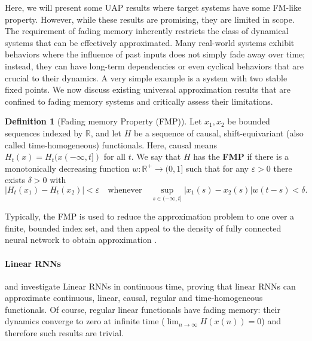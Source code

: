 \documentclass{article}
\theoremstyle{definition}
\newtheorem{definition}{Definition}
\theoremstyle{remark}
\newcounter{ct}
\begin{document}
Here, we will present some UAP results where target systems have some FM-like property.
However, while these results are promising, they are limited in scope.
The requirement of fading memory inherently restricts the class of dynamical systems that can be effectively approximated.
Many real-world systems exhibit behaviors where the influence of past inputs does not simply fade away over time; instead, they can have long-term dependencies or even cyclical behaviors that are crucial to their dynamics.
A very simple example is a system with two stable fixed points.
We now discuss existing universal approximation results that are confined to fading memory systems and critically assess their limitations.



\begin{definition}[Fading memory Property (FMP)]
Let $x_1, x_2$ be bounded sequences indexed by $\mathbb{R}$, and let $H$ be a sequence of causal, shift-equivariant (also called time-homogeneous) functionals.
Here, causal means $H_t(x) = H_t(x(-\infty,t])$ for all $t$.
We say that $H$ has the \textbf{FMP} if there is a monotonically decreasing function $w : \mathbb{R}^+ \to (0, 1]$ such that for any $\varepsilon > 0$ there exists $\delta > 0$ with 
\[
|H_t(x_1) - H_t(x_2)| < \varepsilon \quad \text{whenever} \quad \sup_{s \in (-\infty, t]} |x_1(s) - x_2(s)| w(t - s) < \delta.
\]
\end{definition}

Typically, the FMP is used to reduce the approximation problem to one over a finite, bounded index set, and then appeal to the density of fully connected neural network to obtain approximation \citep{gonon2021fading}. %


\paragraph{Linear RNNs}
\citet{li2020curse} and \citet{li2022approximation} investigate Linear RNNs in continuous time, %
proving that linear RNNs can approximate continuous, linear, causal, regular and time-homogeneous functionals. %
Of course, regular linear functionals have fading memory: their dynamics converge to zero at infinite time ($\lim_{n\rightarrow\infty} H(x(n)) = 0$) and therefore such results are trivial.
 
\end{document}
